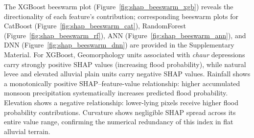 \documentclass[12pt, a4paper]{article}
\begin{document}
The XGBoost beeswarm plot (Figure~\ref{fig:shap_beeswarm_xgb}) reveals the directionality of each feature's contribution; corresponding beeswarm plots for CatBoost (Figure~\ref{fig:shap_beeswarm_cat}), RandomForest (Figure~\ref{fig:shap_beeswarm_rf}), ANN (Figure~\ref{fig:shap_beeswarm_ann}), and DNN (Figure~\ref{fig:shap_beeswarm_dnn}) are provided in the Supplementary Material. For XGBoost, Geomorphology units associated with \textit{chaur} depressions carry strongly positive SHAP values (increasing flood probability), while natural levee and elevated alluvial plain units carry negative SHAP values.  Rainfall shows a monotonically positive SHAP--feature-value relationship: higher accumulated monsoon precipitation systematically increases predicted flood probability.  Elevation shows a negative relationship: lower-lying pixels receive higher flood probability contributions. Curvature shows negligible SHAP spread across its entire value range, confirming the numerical redundancy of this index in flat alluvial terrain.


\end{document}
